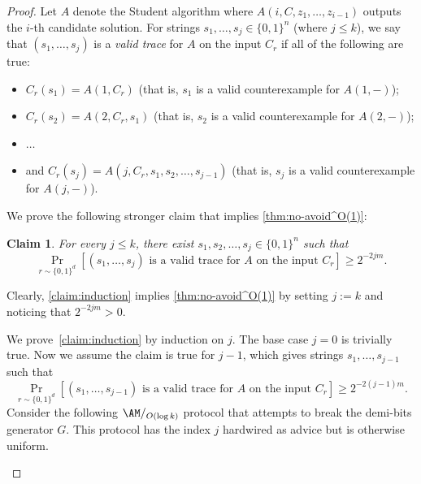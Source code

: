 \documentclass[10pt,a4paper]{article}
\newtheorem{claim}[theorem]{Claim}
\theoremstyle{definition}
\theoremstyle{remark}
\newenvironment{compactitem}{\begin{itemize}}{\end{itemize}}
\begin{document}
\begin{proof}
    Let $A$ denote the Student algorithm where $A(i, C, z_1, \dots, z_{i-1})$ outputs the $i$-th candidate solution. For strings $s_1, \dots, s_j\in \{0,1\}^n$ (where $j\le k$), we say that $(s_1, \dots, s_j)$ is a \emph{valid trace} for $A$ on the input $C_r$ if all of the following are true:
    \begin{compactitem}
        \item $C_r(s_1) = A(1, C_r)$ (that is, $s_1$ is a valid counterexample for $A(1, -)$);
        \item $C_r(s_2) = A(2, C_r, s_1)$ (that is, $s_2$ is a valid counterexample for $A(2, -)$);
        \item $\dots$
        \item and $C_r(s_j) = A(j, C_r, s_1, s_2, \dots, s_{j-1})$ (that is, $s_j$ is a valid counterexample for $A(j, -)$).
    \end{compactitem}
    
    We prove the following stronger claim that implies \autoref{thm:no-avoid^O(1)}:
    
    \begin{claim}\label{claim:induction}
        For every $j\le k$, there exist $s_1, s_2, \dots, s_j \in \{0,1\}^n$ such that
        \[\Pr_{r\sim \{0,1\}^d}[(s_1, \dots, s_j)\text{ is a valid trace for $A$ on the input $C_r$}] \ge 2^{-2jm}.\]
    \end{claim}
    Clearly, \autoref{claim:induction} implies \autoref{thm:no-avoid^O(1)} by setting $j := k$ and noticing that $2^{-2jm} > 0$.

    We prove~\autoref{claim:induction} by induction on $j$. The base case $j=0$ is trivially true. Now we assume the claim is true for $j-1$, which gives strings $s_1,\dots,s_{j-1}$ such that
    \[\Pr_{r\sim \{0,1\}^d}[(s_1, \dots, s_{j-1})\text{ is a valid trace for $A$ on the input $C_r$}] \ge 2^{-2(j-1)m}.\]
    Consider the following $\AM/_{O(\log k)}$ protocol that attempts to break the demi-bits generator $G$. This protocol has the index $j$ hardwired as advice but is otherwise uniform.


\begin{algorithm2e}[H]
      \caption{The $\AM/_{O(\log k)}$ protocol $\mathcal{P}$ breaking demi-bits generator $G$} 
      \label{alg:am}
	

\end{algorithm2e}
\end{proof}
\end{document}
